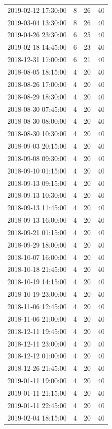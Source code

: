 \begin{tabular}{lrrr}
2019-02-12 17:30:00 & 8 & 26 & 40 \\
2019-03-04 13:30:00 & 8 & 26 & 40 \\
2019-04-26 23:30:00 & 6 & 25 & 40 \\
2019-02-18 14:45:00 & 6 & 23 & 40 \\
2018-12-31 17:00:00 & 6 & 21 & 40 \\
2018-08-05 18:15:00 & 4 & 20 & 40 \\
2018-08-26 17:00:00 & 4 & 20 & 40 \\
2018-08-29 18:30:00 & 4 & 20 & 40 \\
2018-08-30 07:45:00 & 4 & 20 & 40 \\
2018-08-30 08:00:00 & 4 & 20 & 40 \\
2018-08-30 10:30:00 & 4 & 20 & 40 \\
2018-09-03 20:15:00 & 4 & 20 & 40 \\
2018-09-08 09:30:00 & 4 & 20 & 40 \\
2018-09-10 01:15:00 & 4 & 20 & 40 \\
2018-09-13 09:15:00 & 4 & 20 & 40 \\
2018-09-13 10:30:00 & 4 & 20 & 40 \\
2018-09-13 11:45:00 & 4 & 20 & 40 \\
2018-09-13 16:00:00 & 4 & 20 & 40 \\
2018-09-21 01:15:00 & 4 & 20 & 40 \\
2018-09-29 18:00:00 & 4 & 20 & 40 \\
2018-10-07 16:00:00 & 4 & 20 & 40 \\
2018-10-18 21:45:00 & 4 & 20 & 40 \\
2018-10-19 14:15:00 & 4 & 20 & 40 \\
2018-10-19 23:00:00 & 4 & 20 & 40 \\
2018-11-06 12:45:00 & 4 & 20 & 40 \\
2018-11-06 21:00:00 & 4 & 20 & 40 \\
2018-12-11 19:45:00 & 4 & 20 & 40 \\
2018-12-11 23:00:00 & 4 & 20 & 40 \\
2018-12-12 01:00:00 & 4 & 20 & 40 \\
2018-12-26 21:45:00 & 4 & 20 & 40 \\
2019-01-11 19:00:00 & 4 & 20 & 40 \\
2019-01-11 21:15:00 & 4 & 20 & 40 \\
2019-01-11 22:45:00 & 4 & 20 & 40 \\
2019-02-04 18:15:00 & 4 & 20 & 40 \\

\end{tabular}
